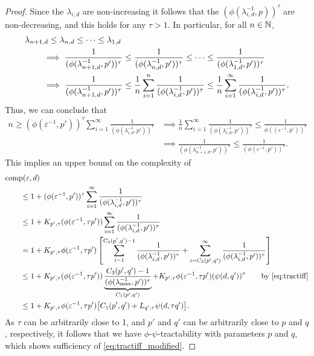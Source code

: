 \documentclass{article}
\theoremstyle{definition}
\begin{document}
{\begin{proof}
Since the $\lambda_{i,d}$ are non-increasing it follows that the $(\phi(\lambda_{i, d}^{-1},p))^\tau$ are non-decreasing, and this holds for any $\tau>1$.  In particular, for all $n \in \mathbb{N}$,
\begin{align*}
    \MoveEqLeft{\lambda_{n+1,d} \le \lambda_{n,d} \le \cdots \le \lambda_{1,d}} \\
    & \implies \frac{1}{(\phi(\lambda_{n+1, d}^{-1},p'))^\tau} \le \frac{1}{(\phi(\lambda_{n, d}^{-1},p'))^\tau} \le \cdots \le \frac{1}{(\phi(\lambda_{1, d}^{-1},p'))^\tau} \\
    & \implies \frac{1}{(\phi(\lambda_{n+1, d}^{-1},p'))^\tau} 
    \le \frac 1n \sum_{i=1}^n  \frac{1}{(\phi(\lambda_{i, d}^{-1},p'))^\tau} 
    \le \frac 1n \sum_{i=1}^\infty  \frac{1}{(\phi(\lambda_{i, d}^{-1},p'))^\tau}.
\end{align*}
Thus, we can conclude that 
\begin{align*}
    n \ge (\phi(\varepsilon^{-1},p'))^\tau \sum_{i=1}^\infty \frac{1}{(\phi(\lambda_{i, d}^{-1},p'))^\tau}
    & \implies 
  \frac 1n \sum_{i=1}^\infty \frac{1}{(\phi(\lambda_{i, d}^{-1},p'))^\tau} \le  \frac{1}{\phi((\varepsilon^{-1},p'))^\tau} \\
   & \implies   \frac{1}{(\phi(\lambda_{n+1, d}^{-1},p'))^\tau} \le \frac{1}{(\phi(\varepsilon^{-1},p'))^\tau}.
\end{align*}
This implies an upper bound on the complexity of
\begin{align*}
       \MoveEqLeft{\comp(\varepsilon,d)} \\
       &\le 1 + (\phi(\varepsilon^{-1},p'))^\tau \sum_{i=1}^\infty \frac{1}{(\phi(\lambda_{i, d}^{-1},p'))^\tau} \\
       &\le 1 +K_{p',\tau} (\phi(\varepsilon^{-1},\tau p')) \sum_{i=1}^\infty \frac{1}{(\phi(\lambda_{i, d}^{-1},p'))^\tau} \\
       & = 1 + K_{p',\tau}\phi(\varepsilon^{-1},\tau p') \left [ \sum_{i=1}^{C_3(p',q')-1} \frac{1}{(\phi(\lambda_{i, d}^{-1},p'))^\tau}  + \sum_{i=C_3(p',q')}^\infty \frac{1}{(\phi(\lambda_{i, d}^{-1},p'))^\tau} \right ] \\
       & \le 1+ K_{p',\tau} (\phi(\varepsilon^{-1},\tau p')) \underbrace{\frac{C_3(p',q')-1}{(\phi(\lambda_{\max}^{-1},p'))^\tau}}_{C_1(p',q')}
       +  K_{p',\tau}\phi(\varepsilon^{-1},\tau p') (\psi(d,q'))^\tau 
        \qquad \text{by \eqref{eq:tractiff}} \\
        & \le 1+ K_{p',\tau} \phi(\varepsilon^{-1},\tau p') \bigl[C_1(p',q') + L_{q',\tau}\psi(d,\tau q') \bigr].
\end{align*}
As $\tau$ can be arbitrarily close to 1, and $p'$ and $q'$ can be arbitrarily close to $p$ and $q$, respectively, it follows that we have $\phi$-$\psi$-tractability with parameters $p$ and $q$, which shows sufficiency of \eqref{eq:tractiff_modified}. 


\end{proof}}
\end{document}
